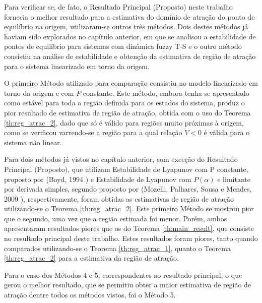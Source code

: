 Para verificar se, de fato, o Resultado Principal (Proposto) neste trabalho fornecia o melhor resultado para a estimativa do domínio de atração do ponto de equilíbrio na origem, utilizaram-se outros três métodos. Dois destes métodos já haviam sido explorados no capítulo anterior, em que se analisou a estabilidade de pontos de equilíbrio para sistemas com dinâmica fuzzy T-S e o outro método consistiu na análise de estabilidade e obtenção da estimativa de região de atração para o sistema linearizado em torno da origem.

O primeiro Método utilizado para comparação consistiu no modelo linearizado em torno da origem e com $P$ constante. Este método, embora tenha se apresentado como estável para toda a região definida para os estados do sistema, produz o pior resultado de estimativa de região de atração, obtida com o uso do Teorema \ref{th:reg_atrac_2}, dado que só é válido para regiões muito próximas à origem, como se verificou varrendo-se a região para a qual relação $\dot{V} < 0 $ é válida para o sistema não linear.

Para dois métodos já vistos no capítulo anterior, com exceção do Resultado Principal (Proposto), que utilizam Estabilidade de Lyapunov com P constante, proposto por (Boyd, 1994 \cite{bookboydl:1994}) e Estabilidade de Lyapunov com $ P(\alpha)$ e limitante por derivada simples, segundo proposto por (Mozelli, Palhares, Sousa e Mendes, 2009 \cite{MPSM:2009}), respectivamente, foram obtidas as estimativas de região de atração utilizando-se o Teorema \ref{th:reg_atrac_2}. Este primeiro Método se mostrou pior que o segundo, uma vez que a região estimada foi menor. Porém, ambos apresentaram resultados piores que os do Teorema \ref{th:main_result}, que consiste no resultado principal deste trabalho. Estes resultados foram piores, tanto quando comparados utilizando-se o Teorema \ref{th:reg_atrac_1}, quanto o Teorema \ref{th:reg_atrac_2} para a estimativa da região de atração. 

Para o caso dos Métodos 4 e 5, correspondentes ao resultado principal, o que gerou o melhor resultado, que se permitiu obter a maior estimativa de região de atração dentre todos os métodos vistos, foi o Método 5.